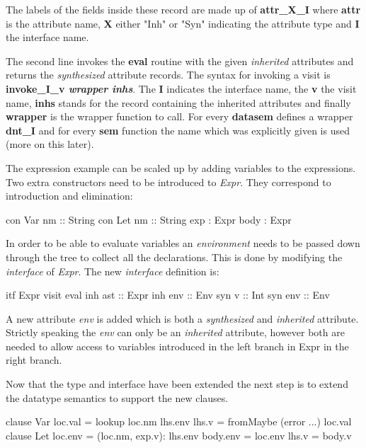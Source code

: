 The labels of the fields inside these record are made up of \textbf{attr\_X\_I} where \textbf{attr} is the attribute name, \textbf{X} either "Inh" or "Syn" indicating the attribute type and \textbf{I} the interface name.

The second line invokes the \textbf{eval} routine with the given \emph{inherited} attributes and returns the \emph{synthesized} attribute records. The syntax for invoking a visit is \textbf{invoke\_I\_v \emph{wrapper inhs}}. The \textbf{I} indicates the interface name, the \textbf{v} the visit name, \textbf{inhs} stands for the record containing the inherited attributes and finally \textbf{wrapper} is the wrapper function to call. For every \textbf{datasem} \rcore defines a wrapper \textbf{dnt\_I} and for every \textbf{sem} function the name which was explicitly given is used (more on this later).

The expression example can be scaled up by adding variables to the expressions. Two extra constructors need to be introduced to \emph{Expr}. They correspond to introduction and elimination:	

\begin{code}
  con Var
    nm      :: String
  con Let
    nm      :: String
    exp     :  Expr
    body    :  Expr
\end{code}

In order to be able to evaluate variables an \emph{environment} needs to be passed down through the tree to collect all the declarations. This is done by modifying the \emph{interface} of \emph{Expr}. The new \emph{interface} definition is:

\begin{code}
itf Expr
  visit eval 
    inh ast  :: Expr
    inh env  :: Env
    syn v    :: Int
    syn env  :: Env
\end{code}

A new attribute \emph{env} is added which is both a \emph{synthesized} and \emph{inherited} attribute. Strictly speaking the \emph{env} can only be an \emph{inherited} attribute, however both are needed to allow access to variables introduced in the left branch in Expr in the right branch.

Now that the type and interface have been extended the next step is to extend the datatype semantics to support the new clauses.

\begin{code}
   clause Var
     loc.val  = lookup loc.nm lhs.env
     lhs.v    = fromMaybe (error ...) loc.val
   clause Let
     loc.env   = (loc.nm, exp.v): lhs.env
     body.env  = loc.env
     lhs.v     = body.v
\end{code}

